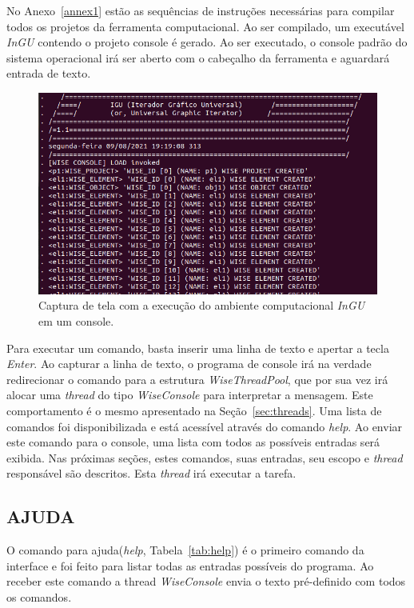 No Anexo~\ref{annex1} estão as sequências de instruções necessárias para compilar todos os projetos da ferramenta computacional. Ao ser compilado, um executável \textit{InGU} contendo o projeto console é gerado. Ao ser executado, o console padrão do sistema operacional irá ser aberto com o cabeçalho da ferramenta e aguardará entrada de texto.

\begin{figure}[!htbp]
	\centering
	\includegraphics[scale=0.45]{Figures/InGU_console.png}
	\caption{Captura de tela com a execução do ambiente computacional \textit{InGU} em um console.}
	\label{fig11:ajuda}
\end{figure}

Para executar um comando, basta inserir uma linha de texto e apertar a tecla \textit{Enter}.  Ao capturar a linha de texto, o programa de console irá na verdade redirecionar o comando para a estrutura \textit{WiseThreadPool}, que por sua vez irá alocar uma \textit{thread} do tipo \textit{WiseConsole} para interpretar a mensagem. Este comportamento é o mesmo apresentado na Seção~\ref{sec:threads}. Uma lista de comandos foi disponibilizada e está acessível através do comando \textit{help}. Ao enviar este comando para o console, uma lista com todos as possíveis entradas será exibida. Nas próximas seções, estes comandos, suas entradas, seu escopo e \textit{thread} responsável são descritos. Esta \textit{thread} irá executar a tarefa. 

\subsection{AJUDA}\label{sec:help}

O comando para ajuda(\textit{help}, Tabela~\ref{tab:help}) é o primeiro comando da interface e foi feito para listar todas as entradas possíveis do programa. Ao receber este comando a thread \textit{WiseConsole} envia o texto pré-definido com todos os comandos.

